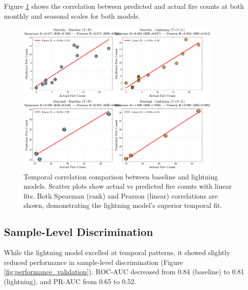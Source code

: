 \documentclass[11pt,a4paper]{article}
\begin{document}
Figure \ref{fig:temporal_correlations} shows the correlation between predicted and actual fire counts at both monthly and seasonal scales for both models.

\begin{figure}[H]
\centering
\includegraphics[width=0.9\textwidth]{../output/figures/temporal_correlations_comparison.png}
\caption{Temporal correlation comparison between baseline and lightning models. Scatter plots show actual vs predicted fire counts with linear fits. Both Spearman (rank) and Pearson (linear) correlations are shown, demonstrating the lightning model's superior temporal fit.}
\label{fig:temporal_correlations}
\end{figure}

\subsection{Sample-Level Discrimination}

While the lightning model excelled at temporal patterns, it showed slightly reduced performance in sample-level discrimination (Figure \ref{fig:performance_validation}). ROC-AUC decreased from 0.84 (baseline) to 0.81 (lightning), and PR-AUC from 0.65 to 0.52.
\end{document}
